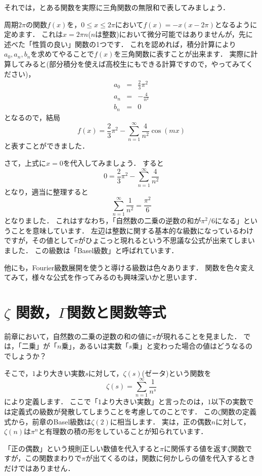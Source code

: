 それでは，とある関数を実際に三角関数の無限和で表してみましょう．

周期$2 \pi$の関数$f(x)$を，$0 \le x \le 2\pi$において$f(x)=-x(x-2 \pi)$となるように定めます．
これは$x=2\pi n$($n$は整数)において微分可能ではありませんが，先に述べた「性質の良い」関数の1つです．
これを認めれば，積分計算により$a_0, a_n, b_n$を求めてやることで$f(x)$を三角関数に表すことが出来ます．
実際に計算してみると(部分積分を使えば高校生にもできる計算ですので，やってみてください)，
\begin{eqnarray*}
	a_0 &=& \frac{2}{3}\pi ^2 \\
	a_n &=& -\frac{4}{n^2} \\
	b_n &=& 0
\end{eqnarray*}
となるので，結局
\[
	f(x)=\frac{2}{3}\pi ^2-\sum_{n=1}^{\infty} \frac{4}{n^2} \cos (mx)
\]
と表すことができました．

さて，上式に$x=0$を代入してみましょう．
すると
\[
	0=\frac{2}{3}\pi ^2-\sum_{n=1}^{\infty} \frac{4}{n^2}
\]
となり，適当に整理すると
\[
	\sum_{n=1}^{\infty} \frac{1}{n^2} = \frac{\pi ^2}{6}
\]
となりました．
これはすなわち，「自然数の二乗の逆数の和が$\pi ^2 /6$になる」ということを意味しています．
左辺は整数に関する基本的な級数になっているわけですが，その値として$\pi$がひょこっと現れるという不思議な公式が出来てしまいました．
この級数は「Basel級数」と呼ばれています．

他にも，Fourier級数展開を使うと導ける級数は色々あります．
関数を色々変えてみて，様々な公式を作ってみるのも興味深いかと思います．

\section{$\zeta$ 関数，$\Gamma$関数と関数等式}

前章において，自然数の二乗の逆数の和の値に$\pi$が現れることを見ました．
では，「二乗」が「$n$乗」，あるいは実数「$s$乗」と変わった場合の値はどうなるのでしょうか？

そこで，$1$より大きい実数$s$に対して，$\zeta (s)$(ゼータ)という関数を
\[
	\zeta (s) = \sum_{n=1}^{\infty} \frac{1}{n^{s}}
\]
により定義します．
ここで「$1$より大きい実数」と言ったのは，$1$以下の実数では定義式の級数が発散してしまうことを考慮してのことです．
この$\zeta$関数の定義式から，前章のBasel級数は$\zeta (2)$に相当します．
実は，正の偶数$n$に対して，$\zeta (n)$は$\pi ^{n}$と有理数の積の形をしていることが知られています．

「正の偶数」という規則正しい数値を代入すると$\pi$に関係する値を返す$\zeta$関数ですが，この関数まわりで$\pi$が出てくるのは，関数に何かしらの値を代入するときだけではありません．

